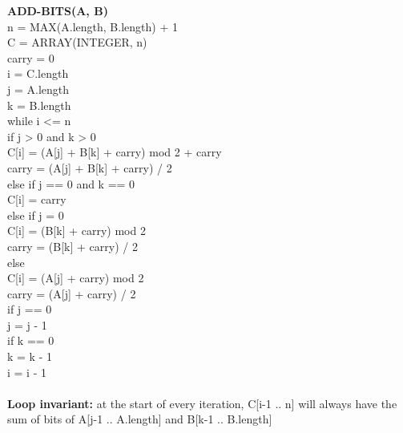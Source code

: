 \documentclass{article}
\begin{document}
\noindent\textbf{ADD-BITS(A, B)}\\
\indent n = MAX(A.length, B.length) + 1\\
\indent C = ARRAY(INTEGER, n)\\
\indent carry = 0\\
\indent i = C.length\\
\indent j = A.length\\
\indent k = B.length\\
\indent while i <= n\\
\indent\indent if j > 0 and k > 0\\
\indent\indent\indent C[i] = (A[j] + B[k] + carry) mod 2 + carry\\
\indent\indent\indent carry = (A[j] + B[k] + carry) / 2\\
\indent\indent else if j == 0 and k == 0\\
\indent\indent\indent C[i] = carry\\
\indent\indent else if j = 0\\
\indent\indent\indent C[i] = (B[k] + carry) mod 2\\
\indent\indent\indent carry = (B[k] + carry)  / 2\\
\indent\indent else\\
\indent\indent\indent C[i] = (A[j] + carry) mod 2\\
\indent\indent\indent carry = (A[j] + carry)  / 2\\
\indent\indent if j == 0\\
\indent\indent\indent j = j - 1\\
\indent\indent if k == 0\\
\indent\indent\indent k = k - 1\\
\indent\indent i = i - 1\\\\

\noindent \textbf{Loop invariant:} at the start of every
iteration, C[i-1 .. n] will always have the sum of bits of
A[j-1 .. A.length] and B[k-1 .. B.length]\\
\end{document}
